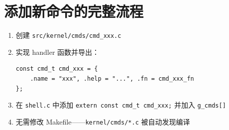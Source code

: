 \section{添加新命令的完整流程}

\begin{enumerate}
  \item 创建 \texttt{src/kernel/cmds/cmd\_xxx.c}
  \item 实现 handler 函数并导出：
\begin{lstlisting}[style=cstyle]
const cmd_t cmd_xxx = {
    .name = "xxx", .help = "...", .fn = cmd_xxx_fn
};
\end{lstlisting}
  \item 在 \texttt{shell.c} 中添加 \texttt{extern const cmd\_t cmd\_xxx;} 并加入 \texttt{g\_cmds[]}
  \item 无需修改 Makefile——\texttt{kernel/cmds/*.c} 被自动发现编译
\end{enumerate}


